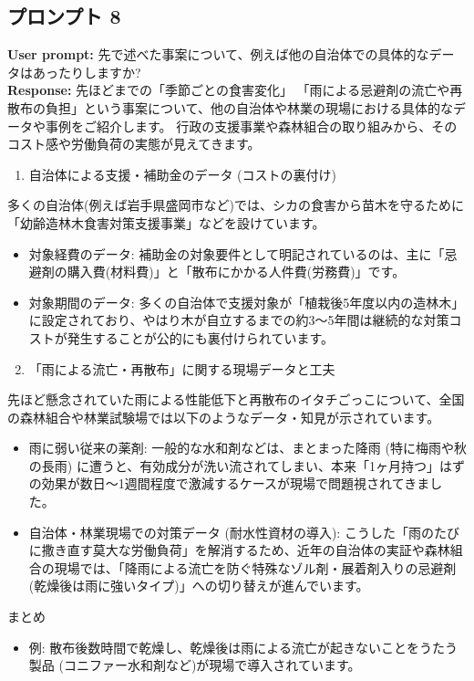 \documentclass[a4paper, 11pt]{jsarticle}
\begin{document}
\subsection{プロンプト 8}
\noindent\textbf{User prompt:} 先で述べた事案について、例えば他の自治体での具体的なデータはあったりしますか? \\
\noindent\textbf{Response:} 先ほどまでの「季節ごとの食害変化」 「雨による忌避剤の流亡や再散布の負担」という事案について、他の自治体や林業の現場における具体的なデータや事例をご紹介します。
行政の支援事業や森林組合の取り組みから、そのコスト感や労働負荷の実態が見えてきます。
\begin{enumerate}
    \item 自治体による支援・補助金のデータ (コストの裏付け)
\end{enumerate}
多くの自治体(例えば岩手県盛岡市など)では、シカの食害から苗木を守るために「幼齢造林木食害対策支援事業」などを設けています\cite{ref8}。
\begin{itemize}
    \item 対象経費のデータ: 補助金の対象要件として明記されているのは、主に「忌避剤の購入費(材料費)」と「散布にかかる人件費(労務費)」です\cite{ref8}。
    \item 対象期間のデータ: 多くの自治体で支援対象が「植栽後5年度以内の造林木」に設定されており、やはり木が自立するまでの約3〜5年間は継続的な対策コストが発生することが公的にも裏付けられています\cite{ref8}。
\end{itemize}
\begin{enumerate}
    \setcounter{enumi}{1}
    \item 「雨による流亡・再散布」に関する現場データと工夫
\end{enumerate}
先ほど懸念されていた雨による性能低下と再散布のイタチごっこについて、全国の森林組合や林業試験場では以下のようなデータ・知見が示されています。
\begin{itemize}
    \item 雨に弱い従来の薬剤: 一般的な水和剤などは、まとまった降雨 (特に梅雨や秋の長雨) に遭うと、有効成分が洗い流されてしまい、本来「1ヶ月持つ」はずの効果が数日〜1週間程度で激減するケースが現場で問題視されてきました。
    \item 自治体・林業現場での対策データ (耐水性資材の導入): こうした「雨のたびに撒き直す莫大な労働負荷」を解消するため、近年の自治体の実証や森林組合の現場では、「降雨による流亡を防ぐ特殊なゾル剤・展着剤入りの忌避剤 (乾燥後は雨に強いタイプ)」への切り替えが進んでいます。
\end{itemize}
まとめ
\begin{itemize}
    \item 例: 散布後数時間で乾燥し、乾燥後は雨による流亡が起きないことをうたう製品 (コニファー水和剤など)が現場で導入されています\cite{ref12,ref15}。
\end{itemize}
\end{document}
